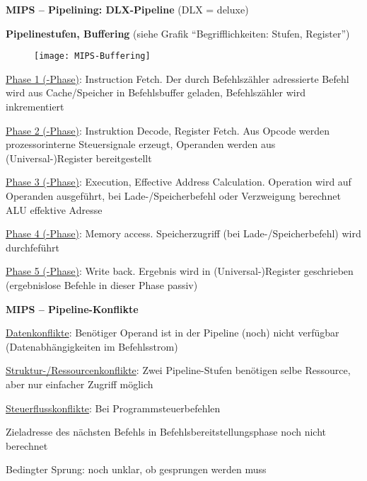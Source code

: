 \textbf{MIPS -- Pipelining: DLX-Pipeline} (DLX = deluxe)
\begin{items}
  \item \textbf{Pipelinestufen, Buffering} (siehe Grafik "`Begrifflichkeiten: Stufen, Register"')
  \begin{figure}[H]\centering\label{MIPS-Buffering}\texttt{[image: MIPS-Buffering]}\end{figure}
  \begin{enumeration}
    \item \underline{Phase 1 (-Phase)}: Instruction Fetch. Der durch Befehlszähler adressierte Befehl wird aus Cache/Speicher in Befehlsbuffer geladen, Befehlszähler wird inkrementiert
    \item \underline{Phase 2 (-Phase)}: Instruktion Decode, Register Fetch. Aus Opcode werden prozessorinterne Steuersignale erzeugt, Operanden werden aus (Universal-)Register bereitgestellt
    \item \underline{Phase 3 (-Phase)}: Execution, Effective Address Calculation. Operation wird auf Operanden ausgeführt, bei Lade-/Speicherbefehl oder Verzweigung berechnet ALU effektive Adresse
    \item \underline{Phase 4 (-Phase)}: Memory access. Speicherzugriff (bei Lade-/Speicherbefehl) wird durchfeführt
    \item \underline{Phase 5 (-Phase)}: Write back. Ergebnis wird in (Universal-)Register geschrieben (ergebnislose Befehle in dieser Phase passiv)
  \end{enumeration}
\end{items}

\newpage

\textbf{MIPS -- Pipeline-Konflikte}
\begin{items}
  \item \underline{Datenkonflikte}: Benötiger Operand ist in der Pipeline (noch) nicht verfügbar (Datenabhängigkeiten im Befehlsstrom)
  \item \underline{Struktur-/Ressourcenkonflikte}: Zwei Pipeline-Stufen benötigen selbe Ressource, aber nur einfacher Zugriff möglich
  \item \underline{Steuerflusskonflikte}: Bei Programmsteuerbefehlen
  \begin{enumeration}
    \item Zieladresse des nächsten Befehls in Befehlsbereitstellungsphase noch nicht berechnet
    \item Bedingter Sprung: noch unklar, ob gesprungen werden muss
  \end{enumeration}
\end{items}

